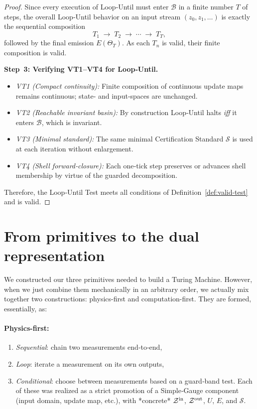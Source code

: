 \documentclass[12pt]{article}
\theoremstyle{definition}
\theoremstyle{plain}
\begin{document}
\begin{proof}
Since every execution of Loop‑Until must enter $\mathcal B$ in a finite number $T$ of steps, the overall Loop‑Until behavior on an input stream $(z_0,z_1,\dots)$ is exactly the sequential composition
\[
  T_1 \;\longrightarrow\; T_2 \;\longrightarrow\;\cdots\;\longrightarrow\; T_T,
\]
followed by the final emission $E(\Theta_T)$.  As each $T_n$ is valid, their finite composition is valid.

\smallskip\noindent\textbf{Step 3: Verifying VT1–VT4 for Loop‑Until.}  
\begin{itemize}
  \item \emph{VT1 (Compact continuity):} Finite composition of continuous update maps remains continuous; state‐ and input‐spaces are unchanged.  
  \item \emph{VT2 (Reachable invariant basin):} By construction Loop‑Until halts \emph{iff} it enters $\mathcal B$, which is invariant.  
  \item \emph{VT3 (Minimal standard):} The same minimal Certification Standard $\mathcal S$ is used at each iteration without enlargement.  
  \item \emph{VT4 (Shell forward‑closure):} Each one‑tick step preserves or advances shell membership by virtue of the guarded decomposition.
\end{itemize}

Therefore, the Loop‑Until Test meets all conditions of Definition~\ref{def:valid-test} and is valid.
\end{proof}

\section{From primitives to the dual representation}
\label{sec:deep-questions}
We constructed our three primitives needed to build a Turing Machine. However, when we just combine them mechanically in an arbitrary order, we actually mix together two constructions: physics-first and computation-first. They are formed, essentially, as:
\paragraph{Physics-first:}
\begin{enumerate}
    \item \textit{Sequential}: chain two measurements end‑to‑end,
   \item \textit{Loop}: iterate a measurement on its own outputs,
   \item \textit{Conditional}: choose between measurements based on a guard‐band test.
     Each of these was realized as a strict promotion of a Simple‑Gauge component (input domain, update map, etc.), with *concrete* $\mathcal Z^{\rm in}$, $\mathcal Z^{\rm out}$, $U$, $E$, and $\mathcal S$.     
\end{enumerate}
\end{document}
